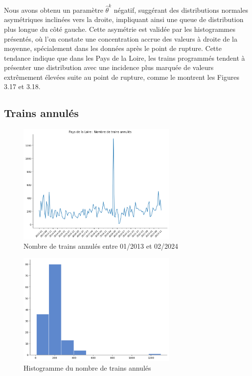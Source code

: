 {Nous avons obtenu un paramètre $\hat{\theta}^k$ négatif, suggérant des distributions normales asymétriques inclinées vers la droite, impliquant ainsi une queue de distribution plus longue du côté gauche. Cette asymétrie est validée par les histogrammes présentés, où l'on constate une concentration accrue des valeurs à droite de la moyenne, spécialement dans les données après le point de rupture. Cette tendance indique que dans les Pays de la Loire, les trains programmés tendent à présenter une distribution avec une incidence plus marquée de valeurs extrêmement élevées suite au point de rupture, comme le montrent les Figures 3.17 et 3.18.


\subsection{Trains annulés}

\begin{figure}[H]
  \centering
  \includegraphics[width=0.7\textwidth]{image/PL-FIG06.png}
  \caption{Nombre de trains annulés entre 01/2013 et 02/2024}
\end{figure}

\begin{figure}[H]
  \centering
  \includegraphics[width=0.7\textwidth]{image/PL-FIG07.png}
  \caption{Histogramme du nombre de trains annulés}
\end{figure}

}
